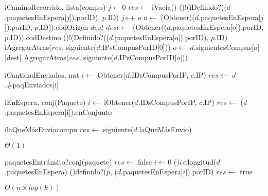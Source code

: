 \begin{Algoritmos}
  \begin{algoritmo}{iCaminoRecorrido}{, }{lista(compu)}
     $j \gets 0$
    $res \gets$ iVacia()
    \While(){!(iDefinido?(($d$.paquetesEnEspera[$j$]).porID), $p$.ID)}{
      $j$++
    }
     $o$
    $o \gets$ (Obtener(($d$.paquetesEnEspera[$j$]).porID, $p$.ID)).codOrigen
     $dest$
    $dest \gets$ (Obtener(($d$.paquetesEnEspera[$o$]).porID, $p$.ID)).codDestino
    \While(){!(Definido?(($d$.paquetesEnEspera[$o$]).porID), $p$.ID)}{
      iAgregarAtras($res$, siguiente($d$.IPsCompusPorID[0]))
      $o \gets$ $d$.siguientesCompus[o][dest]
    }
    AgregarAtras($res$, siguiente($d$.IPsCompusPorID[$o$]))
  \end{algoritmo} 

  \begin{algoritmo}{iCantidadEnviados}{, }{nat}
     $i \gets$ Obtener($d$.IDsCompusPorIP, $c$.IP)
    $res \gets$ $d$.\#paqEnviados[i]
  \end{algoritmo}
 \datosAlgoritmo{} %
  {} %
  {} %
  {} %
  {} %

  \begin{algoritmo}{iEnEspera}{, }{conj(Paquete)}
     $i \gets$ iObtener($d$.IDsCompusPorIP, $c$.IP)
    $res \gets$ ($d$.paquetesEnEspera[i]).enConjunto
  \end{algoritmo}
 \datosAlgoritmo{} %
  {} %
  {} %
  {} %
  {} %

  \begin{algoritmo}{ilaQueM\'{a}sEnvio}{}{compu}
    $res \gets$ siguiente($d$.laQueM\'{a}sEnvio)
  \end{algoritmo}
  \datosAlgoritmo{} %
  {} %
  {} %
  {$\Theta(1)$} %
  {} %

  \begin{algoritmo}{paquetesEntr\'{a}nsito?}{}{conj(paquete)}
    $res \gets$ false 
     $i \gets 0$
    \While(){$i$<longitud($d$.paquetesEnEspera)}{
      \If(){definido?($p$, ($d$.paquetesEnEspera[$i$]).porID)}{
          $res \gets$ true
      }
    }
  \end{algoritmo}
  \datosAlgoritmo{} %
  {} %
  {} %
  {$\Theta(n \times log(k))$} %
  {} %

\end{Algoritmos}

